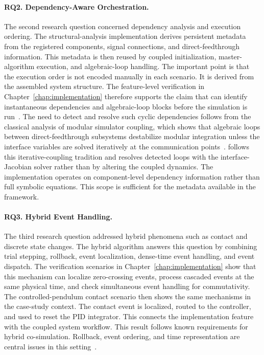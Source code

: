 \paragraph{RQ2. Dependency-Aware Orchestration.}
The second research question concerned dependency analysis and execution ordering.
The structural-analysis implementation derives persistent metadata from the registered components, signal connections, and direct-feedthrough information.
This metadata is then reused by coupled initialization, master-algorithm execution, and algebraic-loop handling.
The important point is that the execution order is not encoded manually in each scenario.
It is derived from the assembled system structure.
The feature-level verification in Chapter~\ref{chap:implementation} therefore supports the claim that \syssimx{} can identify instantaneous dependencies and algebraic-loop blocks before the simulation is run~\cite{arnold_error_2013}.
The need to detect and resolve such cyclic dependencies follows from the classical analysis of modular simulator coupling, which shows that algebraic loops between  direct-feedthrough subsystems destabilize modular integration unless the interface variables are solved iteratively at the communication points~\cite{kubler_two_2000}.
\syssimx{} follows this iterative-coupling tradition and resolves detected loops with the interface-Jacobian solver rather than by altering the coupled dynamics.
The implementation operates on component-level dependency information rather than full symbolic equations.
This scope is sufficient for the metadata available in the framework.

\paragraph{RQ3. Hybrid Event Handling.}
The third research question addressed hybrid phenomena such as contact and discrete state changes.
The hybrid algorithm answers this question by combining trial stepping, rollback, event localization, dense-time event handling, and event dispatch.
The verification scenarios in Chapter~\ref{chap:implementation} show that this mechanism can localize zero-crossing events, process cascaded events at the same physical time, and check simultaneous event handling for commutativity.
The controlled-pendulum contact scenario then shows the same mechanisms in the case-study context.
The contact event is localized, routed to the controller, and used to reset the PID integrator.
This connects the implementation feature with the coupled system workflow.
This result follows known requirements for hybrid co-simulation.
Rollback, event ordering, and time representation are central issues in this setting~\cite{broman_requirements_2015,cremona_hybrid_2019}.

